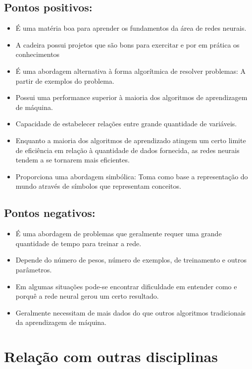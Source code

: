 \documentclass[a4paper]{article}
\begin{document}
\subsection{Pontos positivos:}
\begin{itemize}
   \item É uma matéria boa para aprender os fundamentos da área de redes neurais.
    \item A cadeira possui projetos que são bons para exercitar e por em prática os conhecimentos
    \item É uma abordagem alternativa à forma algorítmica de resolver problemas: A partir de exemplos do problema.
    \item Possui uma performance superior à maioria dos algoritmos de aprendizagem de máquina. 
    \item Capacidade de estabelecer relações entre grande quantidade de variáveis.
    \item Enquanto a maioria dos algoritmos de aprendizado atingem um certo limite de eficiência em relação à quantidade de dados fornecida, as redes neurais tendem a se tornarem mais eficientes.
    \item Proporciona uma abordagem simbólica: Toma como base a representação do mundo através de símbolos que representam conceitos.
    
\end{itemize}

\pagebreak

\subsection{Pontos negativos:}
\begin{itemize}
    \item É uma abordagem de problemas que geralmente requer uma grande quantidade de tempo para treinar a rede.
    \item Depende do número de pesos, número de exemplos, de treinamento e outros parâmetros.
    \item Em algumas situações pode-se encontrar dificuldade em entender como e porquê a rede neural gerou um certo resultado.
    \item Geralmente necessitam de mais dados do que outros algoritmos tradicionais da aprendizagem de máquina.
\end{itemize}


\section{Relação com outras disciplinas}
\end{document}
